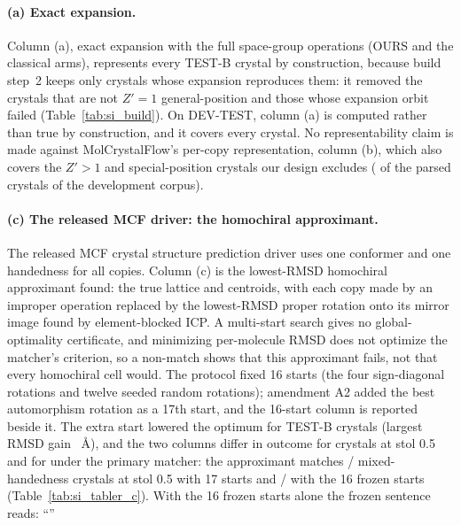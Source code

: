 \documentclass[journal=acsodf,manuscript=article]{achemso}
\begin{document}
\paragraph{(a) Exact expansion.} Column (a), exact expansion with the full space-group operations
(OURS and the classical arms), represents every TEST-B crystal by construction, because build
step~2 keeps only crystals whose expansion reproduces them: it removed the crystals that are
not $Z'=1$ general-position and those whose expansion orbit failed (Table~\ref{tab:si_build}).
On DEV-TEST, column (a) is computed rather than true by construction, and it covers every
crystal.
No representability claim is made against MolCrystalFlow's per-copy representation, column (b),
which also covers the $Z'>1$ and special-position crystals our design excludes (\svDevNotEligible{}
of the \svDevOThree{} parsed crystals of the development corpus).

\paragraph{(c) The released MCF driver: the homochiral approximant.} The released MCF crystal
structure prediction driver uses one conformer and one handedness for all copies. Column (c)
is the lowest-RMSD homochiral approximant found: the true lattice and centroids, with each copy
made by an improper operation replaced by the lowest-RMSD proper rotation onto its mirror image
found by element-blocked ICP. A multi-start search gives no global-optimality certificate, and
minimizing per-molecule RMSD does not optimize the matcher's criterion, so a non-match shows
that this approximant fails, not that every homochiral cell would. The protocol fixed 16 starts (the four sign-diagonal rotations and twelve
seeded random rotations); amendment A2 added the best automorphism rotation as a 17th start,
and the 16-start column is reported beside it. The extra start lowered the optimum for
\svTRAutoImproved{} TEST-B crystals (largest RMSD gain \svTRMaxGain~\AA), and the two columns
differ in outcome for \svTRChangedHalf{} crystals at stol 0.5 and for \svTRChangedPrimary{}
under the primary matcher: the approximant matches \svTRQ/\svTRMixed{} mixed-handedness crystals at
stol 0.5 with 17 starts and \svTRQSixteen/\svTRMixed{} with the 16 frozen starts
(Table~\ref{tab:si_tabler_c}). With the 16 frozen starts alone the frozen sentence reads:
``\svTRTextSixteen''
\end{document}
